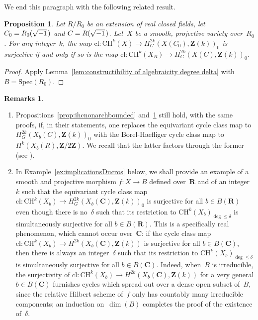 \documentclass[JEP,XML,SOM,Unicode]{cedram}
\theoremstyle{plain}
\newtheorem{prop}[thm]{Proposition}
\theoremstyle{definition}
\newtheorem{rmks}[thm]{Remarks}
\numberwithin{equation}{section}
\newcommand{\cl}{{\mathrm{cl}}}
\renewcommand{\C}{{\mathbf C}}
\newcommand{\R}{{\mathbf R}}
\newcommand{\Z}{{\mathbf Z}}
\newcommand{\CH}{\mathrm{CH}}
\newcommand{\Spec}{\mathrm{Spec}}
\begin{document}
We end this paragraph with the following related result.

\begin{prop}
\label{prop:invIHCextR}
Let $R/R_0$ be an extension of real closed fields,
let $C_0=R_0(\sqrt{-1}\mkern2mu)$
and $C=R(\sqrt{-1}\mkern2mu)$.
Let~$X$ be a smooth, projective variety over~$R_0$.
For any integer~$k$,
the map $\cl:\CH^k(X)\to H^{2k}_G(X(C_0),\Z(k))_0$ is surjective if and only if so is the map $\cl:\CH^k(X_R)\to H^{2k}_G(X(C),\Z(k))_0$.
\end{prop}

\begin{proof}
Apply Lemma~\ref{lem:constructibility of algebraicity degree delta}
with $B=\Spec(R_0)$.
\end{proof}

\skpt
\begin{rmks}
\begin{enumerate}
\item
Propositions~\ref{prop:ihcnonarchbounded} and~\ref{prop:invIHCextR}
still hold,
with the same proofs,
if, in their statements,
one replaces the equivariant cycle class map
to $H^{2k}_G(X_b(C),\Z(k))_0$
with the Borel-Haefliger cycle class map
to $H^k(X_b(R),\Z/2\Z)$. We recall that the latter factors through the former
(see \cite[\textsection\ref*{BW1-subsubsec:topological constraints}]{BW1}).

\item
In Example~\ref{ex:implicationsDucros} below,
we shall provide an example of a smooth and projective morphism $f:X\to B$ defined over~$\R$
and of an integer~$k$
such that the equivariant cycle class map
$\cl:\CH^k(X_b) \to H^{2k}_G(X_b(\C),\Z(k))_0$ is surjective
for all $b\in B(\R)$ even though there is no~$\delta$
such that
its restriction to $\CH^k(X_b)_{\deg\leq\delta}$ is simultaneously surjective
for all $b \in B(\R)$.
This is a specifically real phenomenon,
which cannot occur over~$\C$:
if the cycle class map
$\cl:\CH^k(X_b) \to H^{2k}(X_b(\C),\Z(k))$ is surjective
for all $b\in B(\C)$, then there is always
an integer~$\delta$ such that
its restriction to $\CH^k(X_b)_{\deg\leq\delta}$ is simultaneously surjective
for all $b \in B(\C)$.
Indeed, when~$B$ is irreducible, the surjectivity
of $\cl:\CH^k(X_b) \to H^{2k}(X_b(\C),\Z(k))$
for a very general $b \in B(\C)$ furnishes cycles which spread out over
a dense open subset of~$B$, since the relative Hilbert scheme of~$f$ only has countably many
irreducible components; an induction on~$\dim(B)$ completes the proof of the existence of~$\delta$.
\end{enumerate}
\end{rmks}
\end{document}
